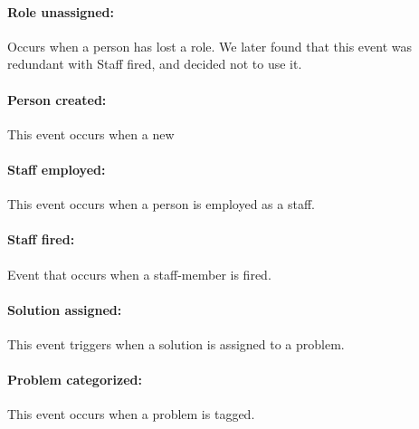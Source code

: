 \paragraph{Role unassigned:}
Occurs when a person has lost a role. We later found that this event was redundant with Staff fired, and decided not to use it.

\paragraph{Person created:}
This event occurs when a new 

\paragraph{Staff employed:}
This event occurs when a person is employed as a staff.

\paragraph{Staff fired:}
Event that occurs when a staff-member is fired.

\paragraph{Solution assigned:}
This event triggers when a solution is assigned to a problem.

\paragraph{Problem categorized:}
This event occurs when a problem is tagged.



